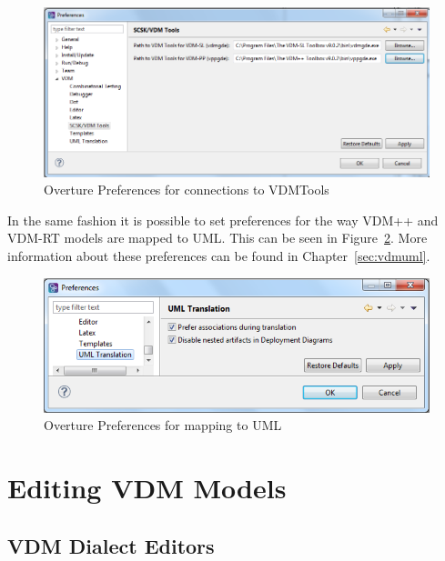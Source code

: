 \documentclass{overturerepchap}
\begin{document}
\begin{figure}[!hbt]
\begin{center}
  \includegraphics[width=\textwidth]{screenDumps/CSKPreferences}
  \caption{Overture Preferences for connections to VDMTools}
  \label{fig:SCSKPreferences}
\end{center}
\end{figure}

In the same fashion it is possible to set preferences for the way VDM++ and VDM-RT models are mapped to UML. 
This can be seen in Figure~\ref{fig:UMLpreferences}. More information about 
these preferences can be found in Chapter~\ref{sec:vdmuml}.

\begin{figure}[!hbt]
\begin{center}
  \includegraphics[width=\textwidth]{screenDumps/UMLpreferences}
  \caption{Overture Preferences for mapping to UML}
  \label{fig:UMLpreferences}
\end{center}
\end{figure}

\chapter{Editing VDM Models}\label{sec:editVDM}

\section{VDM Dialect Editors}
\end{document}
